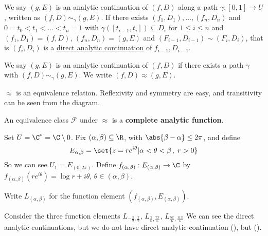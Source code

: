 \documentclass{article}
\begin{document}
\begin{defi}
    We say $(g, E)$ is an analytic continuation of $(f, D)$ along a path $\gamma: [0, 1] \to U$, written as $(f, D) \sim_\gamma (g, E)$.  If there exists $(f_1, D_1), \dotsc, (f_n, D_n)$ and $0 = t_0 < t_1 < \dots < t_n = 1$ with $\gamma([t_{i-1}, t_i]) \subseteq D_i$ for $1 \leq i \leq n$ and $(f_1, D_1) = (f, D)$, $(f_n, D_n) = (g, E)$ and $(F_{i-1}, D_{i-1}) \sim (F_i, D_i)$, that is $(f_i, D_i)$ is a \hyperlink{def:directAnalCont}{direct analytic continuation} of $f_{i-1}, D_{i-1}$.
\end{defi}


\begin{defi}
    We say $(g, E)$ is an analytic continuation of $(f, D)$ if there exists a path $\gamma$ with $(f, D) \sim_\gamma (g, E)$.  We write $(f, D) \approx (g, E)$.
\end{defi}

\begin{remark}
    $\approx$ is an equivalence relation.  Reflexivity and symmetry are easy, and transitivity can be seen from the diagram.
\end{remark}


\begin{defi}
    An equivalence class $\mathcal{F}$ under $\approx$ is a \textbf{complete analytic function}.
\end{defi}

\begin{eg}
    Set $U = \C^* = \C \setminus {0}$.  Fix $(\alpha, \beta) \subseteq \R$, with $\abs{\beta-\alpha} \leq 2 \pi$, and define
    \begin{equation*}E_{\alpha, \beta} = \set{z = r e^{i \theta} | \alpha < \theta < \beta \, , \; r > 0}\end{equation*}
    So we can see $U_1 = E_(0, 2 \pi)$.
    Define $f_{(\alpha, \beta)} : E_{(\alpha, \beta)} \to \C$ by $f_{(\alpha, \beta)} (r e^{i \theta}) = \log r + i \theta$, $\theta \in (\alpha, \beta)$.

    Write $L_{(\alpha, \beta)}$ for the function element $(f_{(\alpha, \beta)}, E_{(\alpha, \beta)})$.

    Consider the three function elements $L_{-\frac\pi2, \frac\pi2}$, $L_{\frac\pi6, \frac{7\pi}6}$, $L_{\frac{5\pi}6, \frac{11\pi}{6}}$
    We can see the direct analytic continuations, but we do not have direct analytic continuation (), but ().
\end{eg}
\end{document}
